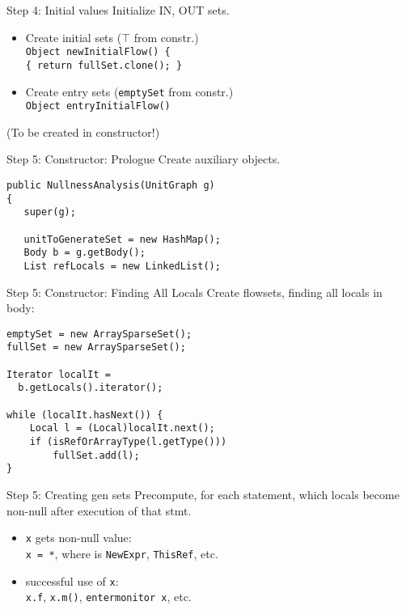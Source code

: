 \begin{slide}{Step 4: Initial values}
\vspace*{-0.1in}
Initialize IN, OUT sets.
\begin{itemize}

\item Create initial sets ($\top$ from constr.)\\
{\tt Object newInitialFlow() \{\\
\qquad \tt \{ return fullSet.clone(); \} }

\vspace*{0.1in}

\item Create entry sets ({\tt emptySet} from constr.)\\
{\tt Object entryInitialFlow()}\\
\end{itemize}

(To be created in constructor!)
\end{slide}

\begin{slide}{Step 5: Constructor: Prologue}
\vspace*{-0.1in}
Create auxiliary objects.
\vspace*{0.05in}
\begin{verbatim}
public NullnessAnalysis(UnitGraph g)
{
   super(g);

   unitToGenerateSet = new HashMap();
   Body b = g.getBody();
   List refLocals = new LinkedList();
\end{verbatim}
\end{slide}

\begin{slide}{Step 5: Constructor: Finding All Locals}
\vspace*{-0.2in}
Create flowsets, finding all locals in body:

\vspace*{-0.05in}
\begin{verbatim}
emptySet = new ArraySparseSet();
fullSet = new ArraySparseSet();

Iterator localIt = 
  b.getLocals().iterator();

while (localIt.hasNext()) {
    Local l = (Local)localIt.next();
    if (isRefOrArrayType(l.getType()))
        fullSet.add(l);
}
\end{verbatim}
\end{slide}

\begin{slide}{Step 5: Creating gen sets}
Precompute, for each statement, which locals become non-null after execution of that stmt.

\begin{itemize}
\item {\tt x} gets non-null value:\\
{\tt x = *}, where {\tt *} is {\tt NewExpr}, {\tt ThisRef}, etc.
\item successful use of {\tt x}:\\
{\tt x.f}, {\tt x.m()}, {\tt entermonitor x}, etc.
\end{itemize}
\end{slide}

